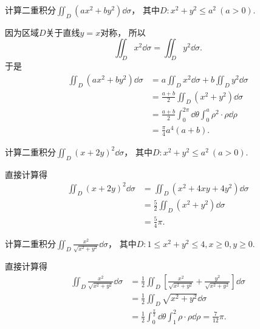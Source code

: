 \begin{example}
计算二重积分\(\iint_D (a x^2 + b y^2) \dd{\sigma}\)，
其中\(D: x^2 + y^2 \leq a^2\ (a>0)\).
\begin{solution}
因为区域\(D\)关于直线\(y=x\)对称，
所以\begin{equation*}
	\iint_D x^2 \dd{\sigma} = \iint_D y^2 \dd{\sigma}.
\end{equation*}
于是\begin{align*}
	\iint_D (a x^2 + b y^2) \dd{\sigma}
	&= a \iint_D x^2 \dd{\sigma} + b \iint_D y^2 \dd{\sigma} \\
	&= \frac{a+b}2 \iint_D (x^2 + y^2) \dd{\sigma} \\
	&= \frac{a+b}2 \int_0^{2\pi} \dd{\theta} \int_0^a \rho^2 \cdot \rho \dd{\rho} \\
	&= \frac\pi4 a^4 (a+b).
\end{align*}
\end{solution}
\end{example}
\begin{example}
计算二重积分\(\iint_D (x+2y)^2 \dd{\sigma}\)，
其中\(D: x^2 + y^2 \leq a^2\ (a>0)\).
\begin{solution}
直接计算得\begin{align*}
	\iint_D (x+2y)^2 \dd{\sigma}
	&= \iint_D (x^2+4xy+4y^2) \dd{\sigma} \\ %
	&= \frac52 \iint_D (x^2+y^2) \dd{\sigma} \\
	&= \frac54 \pi.
\end{align*}
\end{solution}
\end{example}
\begin{example}
计算二重积分\(\iint_D \frac{x^2}{\sqrt{x^2+y^2}} \dd{\sigma}\)，
其中\(D: 1 \leq x^2+y^2 \leq 4, x\geq0, y\geq0\).
\begin{solution}
直接计算得\begin{align*}
	\iint_D \frac{x^2}{\sqrt{x^2+y^2}} \dd{\sigma}
	&= \frac12 \iint_D \left[ \frac{x^2}{\sqrt{x^2+y^2}} + \frac{y^2}{\sqrt{x^2+y^2}} \right] \dd{\sigma} \\
	&= \frac12 \iint_D \sqrt{x^2+y^2} \dd{\sigma} \\
	&= \frac12 \int_0^{\frac\pi2} \dd{\theta} \int_1^2 \rho \cdot \rho \dd{\rho}
	= \frac{7}{12} \pi.
\end{align*}
\end{solution}
\end{example}
